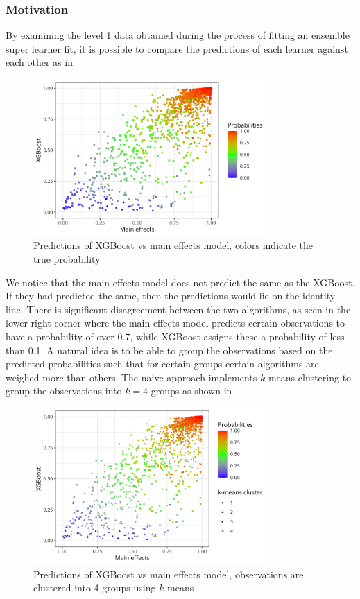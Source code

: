 \documentclass[./main.tex]{subfiles}
\begin{document}
\subsubsection{Motivation}
By examining the level 1 data obtained during the process of fitting an ensemble super learner fit, it is possible to compare the predictions of each learner against each other as in 
\begin{figure}[H]
    \centering
    \includegraphics[width=0.8\textwidth]{figures/esl_preds_xgboost_vs_main.png}
    \caption{Predictions of XGBoost vs main effects model, colors indicate the true probability}
    \label{fig:esl_preds_xgboost_vs_main}
\end{figure}
We notice that the main effects model does not predict the same as the XGBoost. If they had predicted the same, then the predictions would lie on the identity line. There is significant disagreement between the two algorithms, as seen in the lower right corner where the main effects model predicts certain observations to have a probability of over 0.7, while XGBoost assigns these a probability of less than 0.1. A natural idea is to be able to group the observations based on the predicted probabilities such that for certain groups certain algorithms are weighed more than others. The naive approach implements $ k $-means clustering to group the observations into $ k = 4 $ groups as shown in  
\begin{figure}[H]
    \centering
    \includegraphics[width=0.8\textwidth]{figures/esl_preds_xgboost_vs_main_kmeans.png}
    \caption{Predictions of XGBoost vs main effects model, observations are clustered into 4 groups using $ k $-means}
    \label{fig:esl_preds_xgboost_vs_main_kmeans}
\end{figure}
\end{document}
